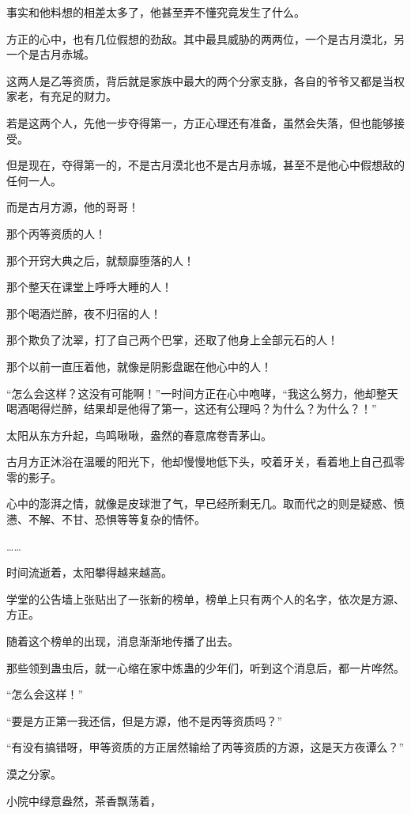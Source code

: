 \begin{this_body}
事实和他料想的相差太多了，他甚至弄不懂究竟发生了什么。

方正的心中，也有几位假想的劲敌。其中最具威胁的两两位，一个是古月漠北，另一个是古月赤城。

这两人是乙等资质，背后就是家族中最大的两个分家支脉，各自的爷爷又都是当权家老，有充足的财力。

若是这两个人，先他一步夺得第一，方正心理还有准备，虽然会失落，但也能够接受。

但是现在，夺得第一的，不是古月漠北也不是古月赤城，甚至不是他心中假想敌的任何一人。

而是古月方源，他的哥哥！

那个丙等资质的人！

那个开窍大典之后，就颓靡堕落的人！

那个整天在课堂上呼呼大睡的人！

那个喝酒烂醉，夜不归宿的人！

那个欺负了沈翠，打了自己两个巴掌，还取了他身上全部元石的人！

那个以前一直压着他，就像是阴影盘踞在他心中的人！

“怎么会这样？这没有可能啊！”一时间方正在心中咆哮，“我这么努力，他却整天喝酒喝得烂醉，结果却是他得了第一，这还有公理吗？为什么？为什么？！”

太阳从东方升起，鸟鸣啾啾，盎然的春意席卷青茅山。

古月方正沐浴在温暖的阳光下，他却慢慢地低下头，咬着牙关，看着地上自己孤零零的影子。

心中的澎湃之情，就像是皮球泄了气，早已经所剩无几。取而代之的则是疑惑、愤懑、不解、不甘、恐惧等等复杂的情怀。

……

时间流逝着，太阳攀得越来越高。

学堂的公告墙上张贴出了一张新的榜单，榜单上只有两个人的名字，依次是方源、方正。

随着这个榜单的出现，消息渐渐地传播了出去。

那些领到蛊虫后，就一心缩在家中炼蛊的少年们，听到这个消息后，都一片哗然。

“怎么会这样！”

“要是方正第一我还信，但是方源，他不是丙等资质吗？”

“有没有搞错呀，甲等资质的方正居然输给了丙等资质的方源，这是天方夜谭么？”

漠之分家。

小院中绿意盎然，茶香飘荡着，


\end{this_body}
